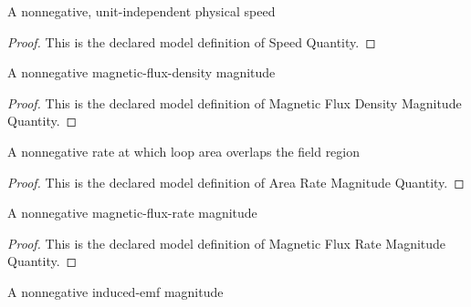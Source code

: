 \begin{definition}
  \label{def:physics:phyx-mini-0973:phyxminiproblems-problemphyxmini0973-speedquantity}
  A nonnegative, unit-independent physical speed
\end{definition}
\begin{proof}
  This is the declared model definition of Speed Quantity.
\end{proof}
\begin{definition}
  \label{def:physics:phyx-mini-0973:phyxminiproblems-problemphyxmini0973-magneticfluxdensitymagnitudequantity}
  A nonnegative magnetic-flux-density magnitude
\end{definition}
\begin{proof}
  This is the declared model definition of Magnetic Flux Density Magnitude Quantity.
\end{proof}
\begin{definition}
  \label{def:physics:phyx-mini-0973:phyxminiproblems-problemphyxmini0973-arearatemagnitudequantity}
  A nonnegative rate at which loop area overlaps the field region
\end{definition}
\begin{proof}
  This is the declared model definition of Area Rate Magnitude Quantity.
\end{proof}
\begin{definition}
  \label{def:physics:phyx-mini-0973:phyxminiproblems-problemphyxmini0973-magneticfluxratemagnitudequantity}
  A nonnegative magnetic-flux-rate magnitude
\end{definition}
\begin{proof}
  This is the declared model definition of Magnetic Flux Rate Magnitude Quantity.
\end{proof}
\begin{definition}
  \label{def:physics:phyx-mini-0973:phyxminiproblems-problemphyxmini0973-emfmagnitudequantity}
  A nonnegative induced-emf magnitude
\end{definition}
